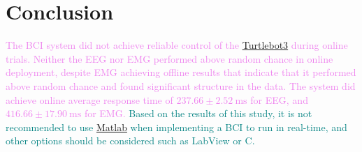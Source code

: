 \section{Conclusion}

\textcolor{violet}{The BCI system did not achieve reliable control of the \href{https://github.com/ROBOTIS-GIT/turtlebot3}{Turtlebot3} during online trials. Neither the EEG nor EMG performed above random chance in online deployment, despite EMG achieving offline results that indicate that it performed above random chance and found significant structure in the data. The system did achieve online average response time of $237.66 \pm 2.52 \: \text{ms}$ for EEG, and $416.66 \pm 17.90 \: \text{ms}$ for EMG.}
\textcolor{teal}{Based on the results of this study, it is not recommended to use \href{https://se.mathworks.com/products/matlab.html}{Matlab} when implementing a BCI to run in real-time, and other options should be considered such as LabView or C.}



\begin{comment}
    A conclusion section is not required. Although a conclusion may review the main points of the paper, do not replicate the abstract as the conclusion. A conclusion might elaborate on the importance of the work or suggest applications and extensions. 
\end{comment}
